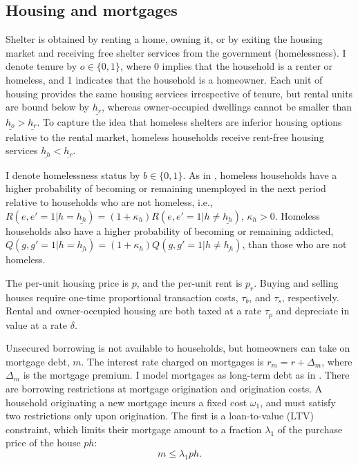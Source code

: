 \documentclass[parskip=full]{article}
\begin{document}
\subsection{Housing and mortgages}
Shelter is obtained by renting a home, owning it, or by exiting the housing market and receiving free shelter services from the government (homelessness). I denote tenure by $o\in\{0,1\}$, where 0 implies that the household is a renter or homeless, and 1 indicates that the household is a homeowner. Each unit of housing provides the same housing services irrespective of tenure, but rental units are bound below by $\underline{{h}_r}$, whereas owner-occupied dwellings cannot be smaller than $\underline{{h}_o}>\underline{{h}_r}$. To capture the idea that homeless shelters are inferior housing options relative to the rental market, homeless households receive rent-free housing services $\underline{{h}_h}<\underline{{h}_r}$. 

I denote homelessness status by $b \in \{0,1\}$. As in \citet{az-2024}, homeless households have a higher probability of becoming or remaining unemployed in the next period relative to households who are not homeless, i.e., $R(e,e'=1|h=\underline{{h}_h})=(1+\kappa_{h})R(e,e'=1|h \neq \underline{{h}_h})$, $\kappa_{h}>0$. Homeless households also have a higher probability of becoming or remaining addicted, $Q(g,g'=1|h=\underline{{h}_h})=(1+\kappa_{h})Q(g,g'=1|h \neq \underline{{h}_h})$, than those who are not homeless.

The per-unit housing price is $p$, and the per-unit rent is $p_{r}$. Buying and selling houses require one-time proportional transaction costs, $\tau_{b}$, and $\tau_{s}$, respectively. Rental and owner-occupied housing are both taxed at a rate $\tau_{p}$ and depreciate in value at a rate $\delta$.

Unsecured borrowing is not available to households, but homeowners can take on mortgage debt, $m$. The interest rate charged on mortgages is $r_m =r+\Delta_m$, where $\Delta_m$ is the mortgage premium. I model mortgages as long-term debt as in \citet{kkk-2021}. There are borrowing restrictions at mortgage origination and origination costs. A household originating a new mortgage incurs a fixed cost $\omega_1$, and must satisfy two restrictions only upon origination. The first is a loan-to-value (LTV) constraint, which limits their mortgage amount to a fraction $\lambda_{1}$ of the purchase price of the house $ph$:
\begin{equation}
\label{eq:ltv}
m \leq \lambda_{1} ph.
\end{equation}
\end{document}
